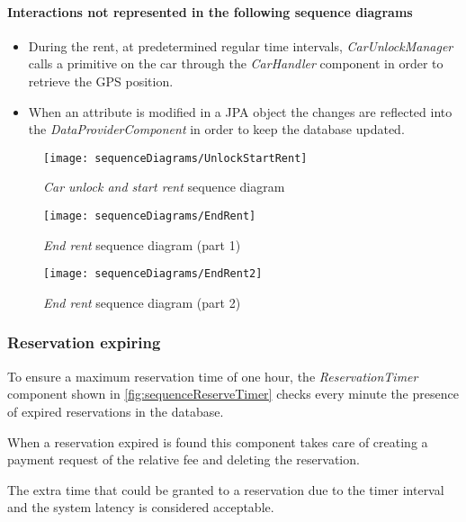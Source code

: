 \paragraph{Interactions not represented in the following sequence diagrams}
\begin{itemize}
	\item During the rent, at predetermined regular time intervals, \emph{CarUnlockManager} calls a primitive on the car through the \emph{CarHandler} component in order to retrieve the GPS position.

	\item When an attribute is modified in a JPA object the changes are reflected into the \emph{DataProviderComponent} in order to keep the database updated.
\end{itemize}
\clearpage

\begin{figure}[h!]
	\centering
	\texttt{[image: sequenceDiagrams/UnlockStartRent]}
	\caption{
		\label{fig:sequenceUnlockStartRent} 
		\emph{Car unlock and start rent} sequence diagram
	}
\end{figure}
\begin{figure}[h!]
	\centering
	\texttt{[image: sequenceDiagrams/EndRent]}
	\caption{
		\label{fig:sequenceEndRent1} 
		\emph{End rent} sequence diagram (part 1)
	}
\end{figure}
\begin{figure}[h!]
	\centering
	\texttt{[image: sequenceDiagrams/EndRent2]}
	\caption{
		\label{fig:sequenceEndRent2} 
		\emph{End rent} sequence diagram (part 2)
	}
\end{figure}

\clearpage
\subsubsection{Reservation expiring}
To ensure a maximum reservation time of one hour, the \emph{ReservationTimer} component shown in \autoref{fig:sequenceReserveTimer} checks every minute the presence of expired reservations in the database. 

When a reservation expired is found this component takes care of creating a payment request of the relative fee and deleting the reservation. 

The extra time that could be granted to a reservation due to the timer interval and the system latency is considered acceptable.

